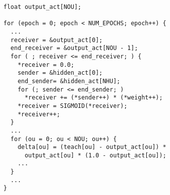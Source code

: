 \begin{lstlisting}[morekeywords={output_act}, belowskip=0pt]
float output_act[NOU];

for (epoch = 0; epoch < NUM_EPOCHS; epoch++) {
  ...
  receiver = &output_act[0];
  end_receiver = &output_act[NOU - 1];
  for ( ; receiver <= end_receiver; ) {
    *receiver = 0.0;
    sender = &hidden_act[0];
    end_sender= &hidden_act[NHU];
    for (; sender <= end_sender; )
      *receiver += (*sender++) * (*weight++);
    *receiver = SIGMOID(*receiver);
    *receiver++;
  }
  ...
  for (ou = 0; ou < NOU; ou++) {
  	delta[ou] = (teach[ou] - output_act[ou]) *
      output_act[ou] * (1.0 - output_act[ou]);
  	...
  }
  ...
}
\end{lstlisting}
